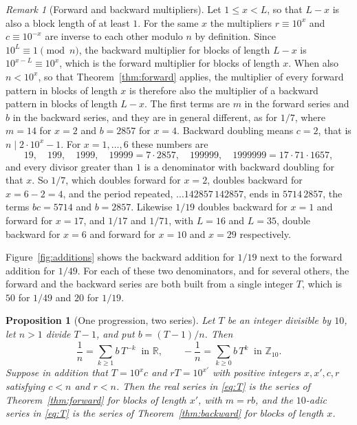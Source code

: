 \documentclass[11pt,a4paper]{amsart}
\newtheorem{proposition}{Proposition}
\theoremstyle{definition}
\theoremstyle{remark}
\newtheorem{remark}{Remark}
\newcommand{\Ztena}{\mathbb{Z}_{10}}
\begin{document}
\begin{remark}[Forward and backward multipliers]\label{rem:dual}
Let $1 \le x < L$, so that $L - x$ is also a block length of at least $1$.
For the same $x$ the multipliers $r \equiv 10^x$ and $c \equiv 10^{-x}$ are
inverse to each other modulo $n$ by definition. Since $10^L \equiv 1 \pmod n$,
the backward multiplier for blocks of length $L - x$ is
$10^{x - L} \equiv 10^x$, which is the forward multiplier for blocks of
length $x$. When also $n < 10^x$, so that Theorem~\ref{thm:forward} applies, the multiplier of every forward pattern in blocks of length $x$ is therefore also the multiplier of a backward pattern in blocks of length $L - x$. The first terms are $m$ in the forward series and $b$ in the backward series, and they are in general different, as for $1/7$, where $m = 14$ for $x = 2$ and $b = 2857$ for $x = 4$. Backward
doubling means $c = 2$, that is $n \mid 2\cdot 10^x - 1$. For
$x = 1, \dots, 6$ these numbers are
\[
19,\quad 199,\quad 1999,\quad 19999 = 7\cdot 2857,\quad 199999,\quad
1999999 = 17\cdot 71\cdot 1657 ,
\]
and every divisor greater than $1$ is a denominator with backward doubling for
that $x$. So $1/7$, which doubles forward for $x = 2$, doubles backward for
$x = 6 - 2 = 4$, and the period repeated, $\dots 142857\,142857$, ends in
$5714\,2857$, the terms $bc = 5714$ and $b = 2857$. Likewise $1/19$ doubles
backward for $x = 1$ and forward for $x = 17$, and $1/17$ and $1/71$, with $L = 16$ and $L = 35$, double backward for $x = 6$ and forward for $x = 10$ and $x = 29$ respectively.
\end{remark}

Figure~\ref{fig:additions} shows the backward addition for $1/19$ next to the
forward addition for $1/49$. For each of these two denominators, and for several others, the forward and the backward series are both built from a single integer $T$, which is $50$ for $1/49$ and $20$ for $1/19$.

\begin{proposition}[One progression, two series]\label{prop:T}
Let $T$ be an integer divisible by $10$, let $n > 1$ divide $T - 1$, and put
$b = (T - 1)/n$. Then
\begin{equation}\label{eq:T}
\frac1n = \sum_{k\ge1} b\,T^{-k} \ \text{ in } \mathbb{R},
\qquad
-\frac1n = \sum_{k\ge0} b\,T^{k} \ \text{ in } \Ztena .
\end{equation}
Suppose in addition that $T = 10^x c$ and $rT = 10^{x'}$ with positive integers $x, x', c, r$ satisfying $c < n$ and $r < n$. Then the real series in \eqref{eq:T} is the series of Theorem~\ref{thm:forward} for blocks of length $x'$, with $m = rb$, and the $10$-adic series in \eqref{eq:T} is the series of Theorem~\ref{thm:backward} for blocks of length $x$.
\end{proposition}
\end{document}

